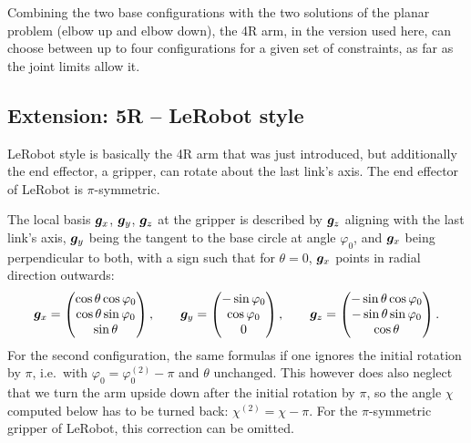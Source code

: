 Combining the two base configurations with the two solutions of the
planar problem (elbow up and elbow down), the 4R arm, in the version used
here, can choose between up to four configurations for a given set of
constraints, as far as the joint limits allow it.

\subsection{Extension: 5R -- LeRobot style}
\label{sec:5r}

LeRobot style is basically the 4R arm that was just introduced, but
additionally the end effector, a gripper, can rotate about the last
link's axis. The end effector of LeRobot is $\pi$-symmetric.

The local basis $\bm{g}_x$, $\bm{g}_y$, $\bm{g}_z$ at the gripper
is described by $\bm{g}_z$ aligning with the last link's axis,
$\bm{g}_y$ being the tangent to the base circle at angle $\varphi_0$,
and $\bm{g}_x$ being perpendicular to both, with a sign such that for
$\theta = 0$, $\bm{g}_x$ points in radial direction outwards:
\[
  \bm{g}_x = \begin{pmatrix} \cos\theta\cos\varphi_0 \\
                               \cos\theta\sin\varphi_0 \\
                               \sin\theta \end{pmatrix} , \qquad
  \bm{g}_y = \begin{pmatrix} -\sin\varphi_0 \\ \cos\varphi_0 \\ 0 \end{pmatrix} , \qquad
  \bm{g}_z = \begin{pmatrix} -\sin\theta\cos\varphi_0 \\
                               -\sin\theta\sin\varphi_0 \\
                               \cos\theta \end{pmatrix} .
\]
For the second configuration, the same formulas if one
ignores the initial rotation by $\pi$, i.e.\ with $\varphi_0 = \varphi_0^{(2)} - \pi$
and $\theta$ unchanged. This however does also neglect that 
we turn the arm upside down after the initial rotation by $\pi$, 
so the angle $\chi$ computed below has to be
turned back: $\chi^{(2)} = \chi - \pi$. For the $\pi$-symmetric gripper
of LeRobot, this correction can be omitted.

